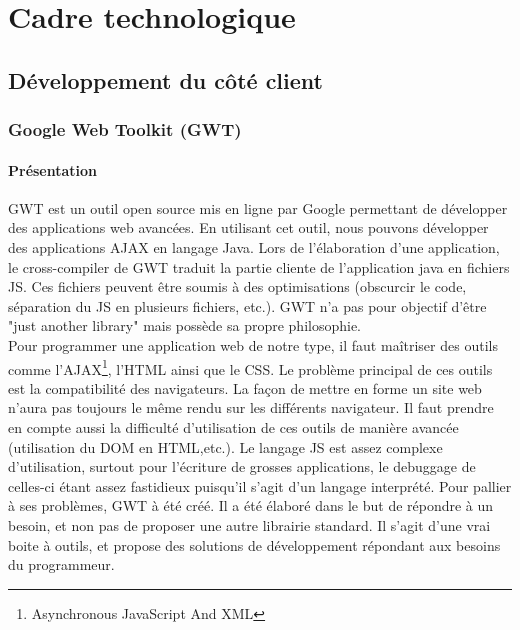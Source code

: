 
\chapter{Cadre technologique}


\section{Développement du côté client}
\subsection{Google Web Toolkit (GWT)}

\subsubsection{Présentation}
GWT est un outil open source mis en ligne par Google permettant de développer des applications web avancées. En utilisant cet outil, nous pouvons développer des applications AJAX en langage Java.
Lors de l'élaboration d'une application, le cross-compiler de GWT traduit la partie cliente de l'application java en fichiers JS. Ces fichiers peuvent être soumis à des optimisations (obscurcir le code, séparation du JS en plusieurs fichiers, etc.). GWT n'a pas pour objectif d'être "just another library" mais possède sa propre philosophie.\\
\newline
\indent
Pour programmer une application web de notre type, il faut maîtriser des outils comme l'AJAX\footnote{Asynchronous JavaScript And XML}, l'HTML ainsi que le CSS. Le problème principal de ces outils est la compatibilité des navigateurs. La façon de mettre en forme un site web n'aura pas toujours le même rendu sur les différents navigateur. Il faut prendre en compte aussi la difficulté d'utilisation de ces outils de manière avancée (utilisation du DOM en HTML,etc.). Le langage JS est assez complexe d'utilisation, surtout pour l'écriture de grosses applications, le debuggage de celles-ci étant assez fastidieux puisqu'il s'agit d'un langage interprété. Pour pallier à ses problèmes, GWT à été créé. Il a été élaboré dans le but de répondre à un besoin, et non pas de proposer une autre librairie standard. Il s'agit d'une vrai boite à outils, et propose des solutions de développement répondant aux besoins du programmeur.

